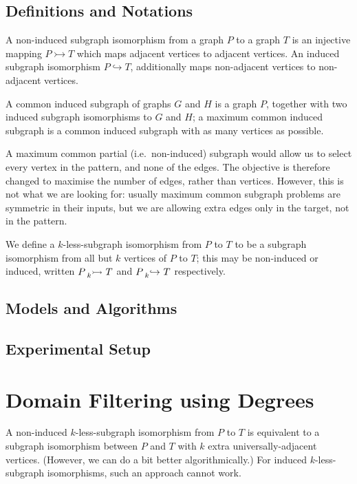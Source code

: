 \documentclass[letterpaper]{article}
\theoremstyle{definition}
\newcommand{\lessnonind}[1]{\prescript{}{#1}{\rightarrowtail}\ }
\newcommand{\lessind}[1]{\prescript{}{#1}{\hookrightarrow}\ }
\begin{document}
\subsection{Definitions and Notations}

A non-induced subgraph isomorphism from a graph $P$ to a graph $T$ is an injective mapping
$P \rightarrowtail T $ which maps adjacent vertices to adjacent vertices. An induced subgraph
isomorphism $P \hookrightarrow T$, additionally maps non-adjacent vertices to non-adjacent
 vertices.

A common induced subgraph of graphs $G$ and $H$ is a graph $P$, together with two induced subgraph
isomorphisms to $G$ and $H$; a maximum common induced subgraph is a common induced subgraph with as
many vertices as possible.

A maximum common partial (i.e.\ non-induced) subgraph would allow us to select every vertex in the
pattern, and none of the edges. The objective is therefore changed to maximise the number of edges,
rather than vertices. However, this is not what we are looking for: usually maximum common subgraph
problems are symmetric in their inputs, but we are allowing extra edges only in the target, not in
the pattern.

We define a $k$-less-subgraph isomorphism from $P$ to $T$ to be a subgraph isomorphism from all
but $k$ vertices of $P$ to $T$; this may be non-induced or induced, written
$P \lessnonind{k} T$ and $P \lessind{k} T$ respectively.

\subsection{Models and Algorithms}

\subsection{Experimental Setup}

\section{Domain Filtering using Degrees}

A non-induced $k$-less-subgraph isomorphism from $P$ to $T$ is equivalent to a subgraph
isomorphism between $P$ and $T$ with $k$ extra universally-adjacent vertices. (However, we can do a
bit better algorithmically.) For induced $k$-less-subgraph isomorphisms, such an approach cannot
work.
\end{document}
